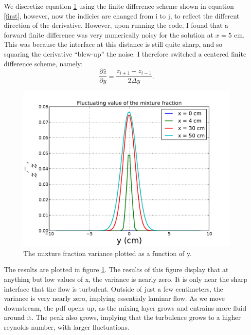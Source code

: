 \documentclass{article}
\begin{document}
We discretize equation \ref{fluc} using the finite difference scheme
shown in equation \ref{first}, however, now the indicies are changed
from i to j, to reflect the different direction of the
derivative. However, upon running the code, I found that a forward
finite difference was very numerically noisy for the solution at $x=5$
cm. This was because the interface at this distance is still quite
sharp, and so squaring the derivative ``blew-up'' the noise. I therefore
switched a centered finite difference scheme, namely:
\begin{equation}
  \frac{\partial \bar z}{\partial y} = \frac{\bar z_{i+1}-\bar z_{i-1}}{2\Delta y}.
\end{equation}

  \begin{figure}[!htb]
   \begin{center}
    \includegraphics[width = 12 cm]{figs/fluc.pdf}
    \caption{The mixture fraction variance plotted as a function of y.}
    \label{fluc}
   \end{center}
  \end{figure}

The results are plotted in figure \ref{fluc}. The results of this figure
display that at anything but low values of x, the variance is nearly
zero. It is only near the sharp interface that the flow is
turbulent. Outside of just a few centimeters, the variance is very
nearly zero, implying essentialy laminar flow. As we move downstream,
the pdf opens up, as the mixing layer grows and entrains more fluid
around it. The peak also grows, implying that the turbulence grows to a
higher reynolds number, with larger fluctuations. 

%
%
%
%
\end{document}
